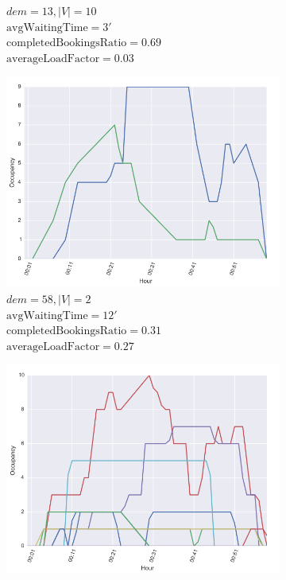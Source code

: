 \documentclass[12pt,a4paper]{article}
\begin{document}
\begin{figure}[]
\begin{subfigure}[b]{0.48\textwidth}
  \caption{$dem = 13, |V| = 10$\\ $\text{avgWaitingTime} = 3'$\\ $\text{completedBookingsRatio} = 0.69$ \\ $\text{averageLoadFactor} = 0.03$}
  \label{dem13v10}
\end{subfigure}
\begin{subfigure}[b]{0.48\textwidth}
  \includegraphics[width=\linewidth]{./images/dem582v}
  \caption{$dem = 58, |V| = 2$\\ $\text{avgWaitingTime} = 12'$\\ $\text{completedBookingsRatio} = 0.31$ \\ $\text{averageLoadFactor} = 0.27$}
  \label{dem58v2}
  \end{subfigure}
  \begin{subfigure}[b]{0.48\textwidth}
  \includegraphics[width=\linewidth]{./images/dem58v10}

\end{subfigure}
\end{figure}
\end{document}
